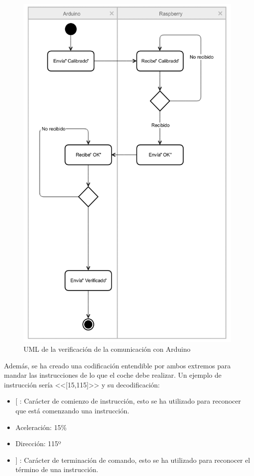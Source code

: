 \documentclass{pclass}
\begin{document}
\begin{itemize}
\begin{itemize}
	\begin{figure}[H]
		\centering
		\includegraphics[width=1\textwidth]{img/umlComunicacion}
		\caption{UML de la verificación de la comunicación con Arduino}
		\label{fig:arduinoVerificacion}
	\end{figure}
	
	Además, se ha creado una codificación entendible por ambos extremos para mandar las instrucciones de lo que el coche debe realizar. Un ejemplo de instrucción sería <<$[$15,115$]$>> y su decodificación:
	\begin{itemize}
		\item $[$ : Carácter de comienzo de instrucción, esto se ha utilizado para reconocer que está comenzando una instrucción.
		\item Aceleración: 15\% 
		\item Dirección: 115º
		\item $]$ : Carácter de terminación de comando, esto se ha utilizado para reconocer el término de una instrucción.
	\end{itemize}
	

\end{itemize}
\end{itemize}
\end{document}
